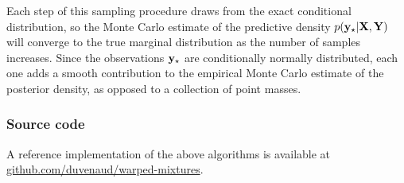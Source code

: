 Each step of this sampling procedure draws from the exact conditional distribution, so the Monte Carlo estimate of the predictive density $p({\bf{y}}_\star | \mathbf{X}, \mathbf{Y})$ will converge to the true marginal distribution as the number of samples increases.
Since the observations ${\bf{y}}_\star$ are conditionally normally distributed, each one adds a smooth contribution to the empirical Monte Carlo estimate of the posterior density, as opposed to a collection of point masses.

\subsubsection{Source code}

A reference implementation of the above algorithms is available at \url{github.com/duvenaud/warped-mixtures}.

\outbpdocument{


}

